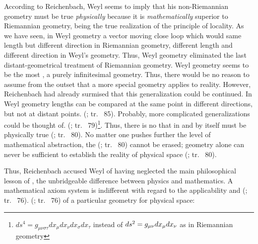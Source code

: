 \documentclass[draft]{article}
\newcommand{\rhp}[2]{(\cite[#1]{Reichenbach1920a}; tr.\ \citeyear{Reichenbach1969} #2)\xspace}
\begin{document}
According to Reichenbach, Weyl seems to imply that his non-Riemannian geometry must be true \emph{physically} because it is \emph{mathematically} superior to Riemannian geometry, being the true realization of the principle of locality. As we have seen, in Weyl geometry a vector moving close loop which would same length but different direction in Riemannian geometry, different length and different direction in Weyl's geometry. Thus, Weyl geometry eliminated the last distant-geometrical treatment of Riemannian geometry. Weyl geometry seems to be the most , a purely infinitesimal geometry. Thus, there would be no reason to assume from the outset that a more special geometry applies to reality. However, Reichenbach had already surmised that this generalization could be continued. In Weyl geometry lengths can be compared at the same point in different directions, but not at distant points.  \rhp{76}{85}. Probably, more complicated generalizations could be thought of.  \rhp{76}{79}\footnote{$d s^{4}=g_{\mu \nu \sigma \tau} d x_{\mu} d x_{\nu} d x_{\sigma} d x_{\tau}$ instead of $d s^{2}=g_{\mu\nu} d x_{\mu} d x_{\nu}$ as in Riemannian geometry}. Thus, there is no  that in and by itself must be physically true \rhp{76}{80}. No matter one pushes further the level of mathematical abstraction, the   \rhp{76}{80} cannot be erased; geometry alone can never be sufficient to establish the reality of physical space \rhp{76}{80}. 

Thus, Reichenbach accused Weyl of having neglected the main philosophical lesson of \gr, the unbridgeable difference between physics and mathematics. A mathematical axiom system is indifferent with regard to the applicability and  \rhp{73}{76}.  \rhp{73}{76} of a particular geometry for physical space:
\end{document}
